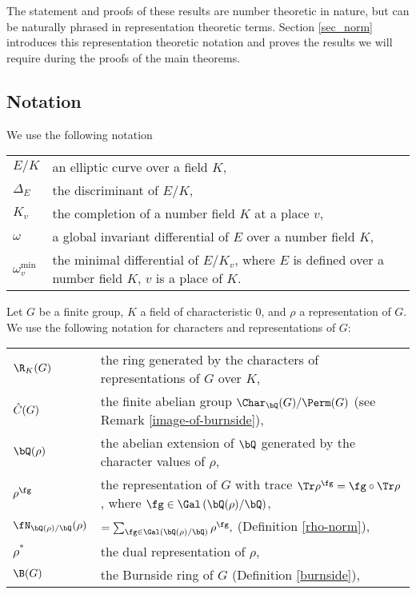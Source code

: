 The statement and proofs of these results are number theoretic in nature, but can be naturally phrased in representation theoretic terms. Section \ref{sec_norm} introduces this representation theoretic notation and proves the results we will require during the proofs of the main theorems.  


\subsection*{Notation}

We use the following notation\newline

\begin{tabular}{l | l}
    $E / K$ & an elliptic curve over a field $K$,\\
    $\Delta_E$ & the discriminant of $E / K$,\\
    $K_v$  & the completion of a number field $K$ at a place $v$, \\
    $\omega$ & a global invariant differential of $E$ over a number field $K$,\\
    $\omega_v^{\min}$ & the minimal differential of $E / K_{v}$, where $E$ is defined over a number field $K$, $v$ is a place of $K$. 
\end{tabular}\newline

Let $G$ be a finite group, $K$ a field of characteristic $0$, and $\rho$ a representation of $G$. We use the following notation for characters and representations of $G$:

\bigskip

\begin{tabular}{l | l}
     $\R_{K}(G)$ & the ring generated by the characters of representations of $G$ over $K$,\\
    $\hat{C}(G)$ & the finite abelian group $\Char_{\bQ}(G) / \Perm(G)$ (see Remark \ref{image-of-burnside}), \\ 
    $\bQ(\rho)$ & the abelian extension of $\bQ$ generated by the character values of $\rho$, \\
    $\rho^{\fg}$ & the representation of $G$ with trace $\Tr \rho^{\fg} = \fg \circ \Tr \rho$, where $\fg \in \Gal\left(\bQ(\rho) / \bQ\right)$,\\
    $\repnorm{\rho}$ &  $ = \sum_{\fg \in \Gal(\bQ(\rho) / \bQ)} \rho^{\fg},$ (Definition \ref{rho-norm}),\\
    $\rho^*$ & the dual representation of $\rho$,
    \\
    $\B(G)$ & the Burnside ring of $G$ (Definition \ref{burnside}), \\
\end{tabular}
\vspace{1em}

